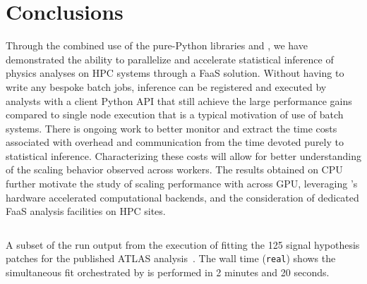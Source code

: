 \section{Conclusions}\label{sec:conclusions}

Through the combined use of the pure-Python libraries \funcX{} and \pyhf{}, we have demonstrated the ability to parallelize and accelerate statistical inference of physics analyses on HPC systems through a FaaS solution.
Without having to write any bespoke batch jobs, inference can be registered and executed by analysts with a client Python API that still achieve the large performance gains compared to single node execution that is a typical motivation of use of batch systems.
There is ongoing work to better monitor and extract the time costs associated with overhead and communication from the time devoted purely to statistical inference.
Characterizing these costs will allow for better understanding of the scaling behavior observed across workers.
The results obtained on CPU further motivate the study of scaling performance with \funcX{} across GPU, leveraging \pyhf{}'s hardware accelerated computational backends, and the consideration of dedicated FaaS analysis facilities on HPC sites.

\clearpage
\begin{listing}
 \inputminted{text}{src/code/funcX_demo_output.txt}
 \caption{A subset of the run output from the execution of fitting the 125 signal hypothesis patches for the published ATLAS analysis~\cite{SUSY-2019-08}.
 The wall time (\texttt{real}) shows the simultaneous fit orchestrated by \funcX{} is performed in 2 minutes and 20 seconds.}
 \label{lst:funcX_demo_output}
\end{listing}
